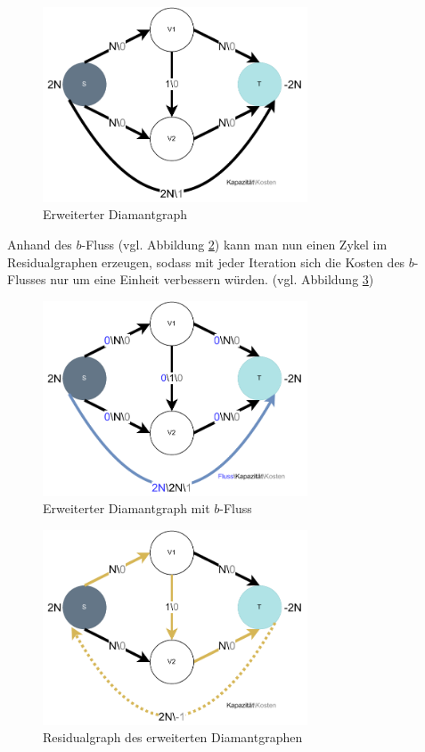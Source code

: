 \begin{figure}[htb]
\centering
\includegraphics[width=0.7\textwidth]{img/leo/graph1-Page-10.drawio.pdf}
\caption{Erweiterter Diamantgraph}
\label{fig:erweiterter_diamantgraph}
\end{figure}

Anhand des $b$-Fluss (vgl. Abbildung \ref{fig:erweiterter_diamantgraph_mit_fluss}) kann man nun einen Zykel im Residualgraphen erzeugen, sodass mit jeder Iteration sich die Kosten des $b$-Flusses nur um eine Einheit verbessern würden. (vgl. Abbildung \ref{fig:erweiterter_diamantgraph_mit_fluss_res})

\begin{figure}[htb]
\centering
\includegraphics[width=0.7\textwidth]{img/leo/graph1-Page-11.drawio.pdf}
\caption{Erweiterter Diamantgraph mit $b$-Fluss}
\label{fig:erweiterter_diamantgraph_mit_fluss}
\end{figure}

\begin{figure}[htb]
\centering
\includegraphics[width=0.7\textwidth]{img/leo/graph1-Page-12.drawio.pdf}
\caption{Residualgraph des erweiterten Diamantgraphen}
\label{fig:erweiterter_diamantgraph_mit_fluss_res}
\end{figure}


